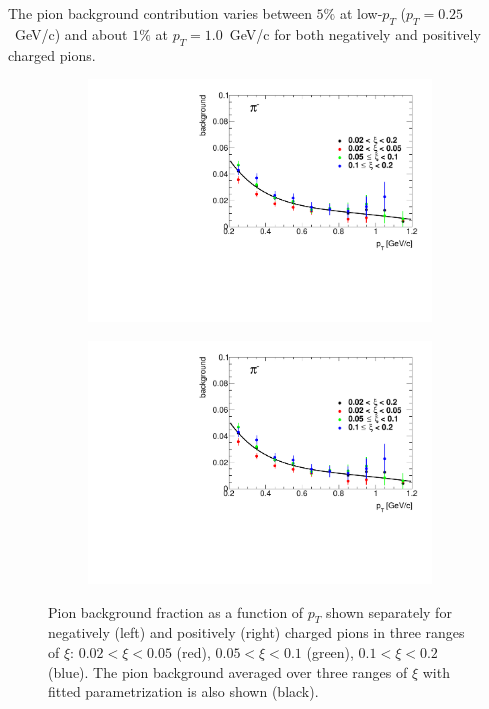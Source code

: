 The pion background contribution varies between $5\%$ at low-$p_T$  ($p_T=0.25$~GeV/c) and about $1\%$ at $p_T=1.0$~GeV/c for both negatively and positively charged pions.
\begin{figure}[htpb]
	\centering
	\begin{subfigure}{.49\textwidth}
		\includegraphics[width=\linewidth, page=1]{chapters/chrgSTAR/img/chargedBkg/bkg0max.pdf}
	\end{subfigure}
	\begin{subfigure}{.49\textwidth}
		\includegraphics[width=\linewidth, page=2]{chapters/chrgSTAR/img/chargedBkg/bkg0max.pdf}
	\end{subfigure}
	\caption[Pion background fraction as a function of $p_T$ shown separately for negatively (left)  and positively (right) charged pions in three ranges of $\xi$.]{Pion background fraction as a function of $p_T$ shown separately for negatively (left)  and positively (right) charged pions in three ranges of $\xi$: $0.02<\xi<0.05$ (red), $0.05<\xi<0.1$ (green), $0.1<\xi<0.2$ (blue). The pion background averaged over three ranges of $\xi$ with fitted parametrization is also shown (black). }
	\label{fig:bkg_pion}
\end{figure}

\FloatBarrier